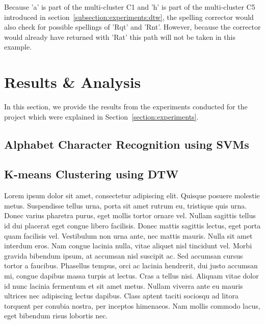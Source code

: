 \documentclass[12pt]{article}
\begin{document}
	Because 'a' is part of the multi-cluster C1 and 'h' is part of the multi-cluster C5 introduced in section~\ref{subsection:experiments:dtw}, the spelling corrector would also check for possible spellings of 'Rqt' and 'Rnt'. However, because the corrector would already have returned with 'Rat' this path will not be taken in this example.	
	
\section{Results \& Analysis}
\label{section:results}
	In this section, we provide the results from the experiments conducted for the project which were explained in Section~\ref{section:experiments}. 
	
	\subsection{Alphabet Character Recognition using SVMs}
	\label{subsubsection:analysis:svm}
	
	\subsection{K-means Clustering using DTW}
	Lorem ipsum dolor sit amet, consectetur adipiscing elit. Quisque posuere molestie metus. Suspendisse tellus urna, porta sit amet rutrum eu, tristique quis urna. Donec varius pharetra purus, eget mollis tortor ornare vel. Nullam sagittis tellus id dui placerat eget congue libero facilisis. Donec mattis sagittis lectus, eget porta quam facilisis vel. Vestibulum non urna ante, nec mattis mauris. Nulla sit amet interdum eros. Nam congue lacinia nulla, vitae aliquet nisl tincidunt vel. Morbi gravida bibendum ipsum, at accumsan nisl suscipit ac. Sed accumsan cursus tortor a faucibus. Phasellus tempus, orci ac lacinia hendrerit, dui justo accumsan mi, congue dapibus massa turpis at lectus. Cras a tellus nisi. Aliquam vitae dolor id nunc lacinia fermentum et sit amet metus. Nullam viverra ante eu mauris ultrices nec adipiscing lectus dapibus. Class aptent taciti sociosqu ad litora torquent per conubia nostra, per inceptos himenaeos. Nam mollis commodo lacus, eget bibendum risus lobortis nec.
	
\end{document}
